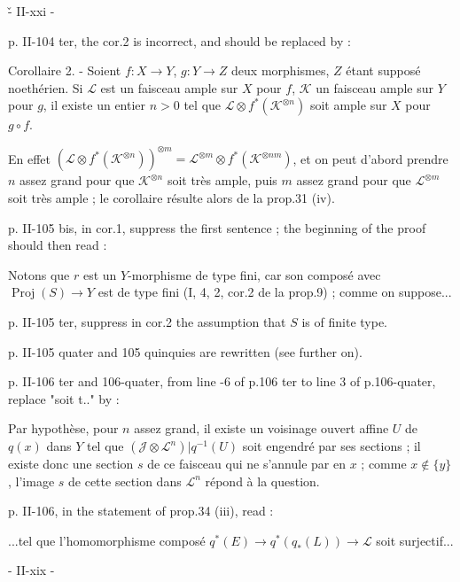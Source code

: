 \v - II-xxi -

p. II-104 ter, the cor.2 is incorrect, and should be replaced by :

Corollaire 2. - Soient $f : X \to Y$, $g : Y \to Z$ deux morphismes, $Z$ étant supposé noethérien. Si $\mathcal{L}$ est un faisceau ample sur $X$ pour $f$, $\mathcal{K}$ un faisceau ample sur $Y$ pour $g$, il existe un entier $n > 0$ tel que $\mathcal{L} \otimes f^*(\mathcal{K}^{\otimes n})$ soit ample sur $X$ pour $g \circ f$.

En effet $(\mathcal{L} \otimes f^*(\mathcal{K}^{\otimes n}))^{\otimes m} = \mathcal{L}^{\otimes m} \otimes f^*(\mathcal{K}^{\otimes nm})$, et on peut d'abord prendre $n$ assez grand pour que $\mathcal{K}^{\otimes n}$ soit très ample, puis $m$ assez grand pour que $\mathcal{L}^{\otimes m}$ soit très ample ; le corollaire résulte alors de la prop.31 (iv).

p. II-105 bis, in cor.1, suppress the first sentence ; the beginning of the proof should then read :

Notons que $r$ est un $Y$-morphisme de type fini, car son composé avec $\operatorname{Proj}(S) \to Y$ est de type fini (I, 4, 2, cor.2 de la prop.9) ; comme on suppose...

p. II-105 ter, suppress in cor.2 the assumption that $S$ is of finite type.

p. II-105 quater and 105 quinquies are rewritten (see further on).

p. II-106 ter and 106-quater, from line -6 of p.106 ter to line 3 of p.106-quater, replace "soit t.." by :

Par hypothèse, pour $n$ assez grand, il existe un voisinage ouvert affine $U$ de $q(x)$ dans $Y$ tel que $(\mathcal{J} \otimes \mathcal{L}^n)|q^{-1}(U)$ soit engendré par ses sections ; il existe donc une section $s$ de ce faisceau qui ne s'annule par en $x$ ; comme $x \notin \{y\}$, l'image $s$ de cette section dans $\mathcal{L}^n$ répond à la question.

p. II-106, in the statement of prop.34 (iii), read :

...tel que l'homomorphisme composé $q^*(E) \to q^*(q_*(L)) \to \mathcal{L}$ soit surjectif...

\newpage



\begin{center}
- II-xix -
\end{center}

